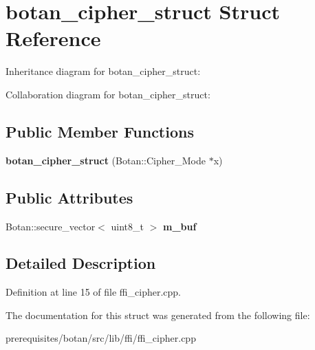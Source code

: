 \hypertarget{structbotan__cipher__struct}{}\section{botan\+\_\+cipher\+\_\+struct Struct Reference}
\label{structbotan__cipher__struct}


Inheritance diagram for botan\+\_\+cipher\+\_\+struct\+:


Collaboration diagram for botan\+\_\+cipher\+\_\+struct\+:
\subsection*{Public Member Functions}
\begin{DoxyCompactItemize}
\item 
\mbox{\label{structbotan__cipher__struct_a77834ec51427bea3d501f2bad2e8614f}} 
{\bfseries botan\+\_\+cipher\+\_\+struct} (Botan\+::\+Cipher\+\_\+\+Mode $\ast$x)
\end{DoxyCompactItemize}
\subsection*{Public Attributes}
\begin{DoxyCompactItemize}
\item 
\mbox{\label{structbotan__cipher__struct_aeedfce9e8d6c449934bd4e3f958b35af}} 
Botan\+::secure\+\_\+vector$<$ uint8\+\_\+t $>$ {\bfseries m\+\_\+buf}
\end{DoxyCompactItemize}


\subsection{Detailed Description}


Definition at line 15 of file ffi\+\_\+cipher.\+cpp.



The documentation for this struct was generated from the following file\+:\begin{DoxyCompactItemize}
\item 
prerequisites/botan/src/lib/ffi/ffi\+\_\+cipher.\+cpp\end{DoxyCompactItemize}
